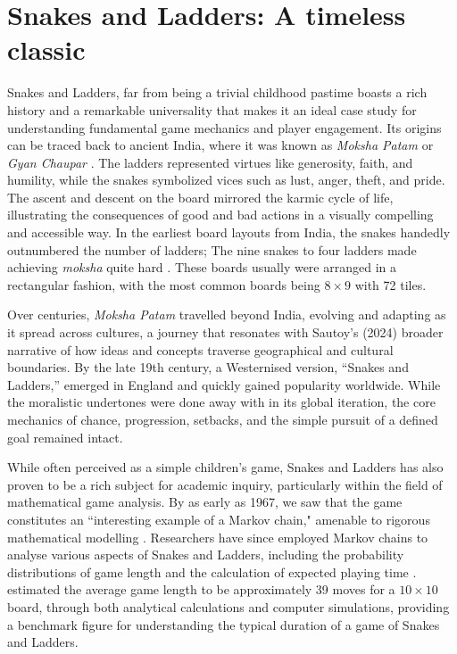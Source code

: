 \section{Snakes and Ladders: A timeless classic}
Snakes and Ladders, far from being a trivial childhood pastime boasts a rich history and a remarkable universality that makes it an ideal case study for understanding fundamental game mechanics and player engagement. Its origins can be traced back to ancient India, where it was known as \textit{Moksha Patam} or \textit{Gyan Chaupar} \autocite{dusautoyWorldEightyGames2024}. The ladders represented virtues like generosity, faith, and humility, while the snakes symbolized vices such as lust, anger, theft, and pride. The ascent and descent on the board mirrored the karmic cycle of life,
illustrating the consequences of good and bad actions in a visually compelling and accessible way. In the earliest board layouts from India, the snakes handedly outnumbered the number of ladders; The nine snakes to four ladders made achieving \textit{moksha} quite hard \autocite{dusautoyWorldEightyGames2024}. These boards usually were arranged in a rectangular fashion, with the most common boards being $8 \times 9$ with 72 tiles.

Over centuries, \textit{Moksha Patam} travelled beyond India, evolving and adapting as it spread across cultures, a journey that resonates with Sautoy’s (2024) broader narrative of how ideas and concepts traverse geographical and cultural boundaries. By the late 19th century, a Westernised version, ``Snakes and Ladders,” emerged in England and quickly gained popularity worldwide. While the moralistic undertones were done away with in its global iteration, the core mechanics of chance, progression, setbacks, and the simple pursuit of a defined goal remained intact.

While often perceived as a simple children's game, Snakes and Ladders has also proven to be a rich subject for academic inquiry, particularly within the field of mathematical game analysis. By as early as 1967,  we saw that the game constitutes an ``interesting example of a Markov chain," amenable to rigorous mathematical modelling \autocite{daykinMarkovChainsSnakes1967a}. Researchers have since employed Markov chains to analyse various aspects of Snakes and Ladders, including the probability distributions of game length \autocite{tunMarkovProcessSnake2021} and the calculation of expected playing time \autocite{althoenHowLongGame1993a, daykinMarkovChainsSnakes1967a}. \textcite{althoenHowLongGame1993a} estimated the average game length to be approximately 39 moves for a $10\times10$ board, through both analytical calculations and computer simulations, providing a benchmark figure for understanding the typical duration of a game of Snakes and Ladders.

